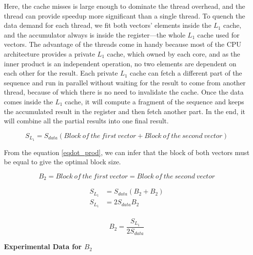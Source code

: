Here, the cache misses is large enough to dominate the thread overhead, 
and the thread can provide speedup more significant than a single thread. 
To quench the data demand for each thread, we fit both vectors' elements 
inside the $L_1$ cache, and the accumulator always is inside the register—the 
whole $L_1$ cache used for vectors. The advantage of the threads come in handy 
because most of the CPU architecture provides a private $L_1$ cache, which 
owned by each core, and as the inner product is an independent operation, 
no two elements are dependent on each other for the result. 
Each private $L_1$ cache can fetch a different part of the sequence 
and run in parallel without waiting for the result to come from another thread, 
because of which there is no need to invalidate the cache. Once the data comes 
inside the $L_1$ cache, it will compute a fragment of the sequence and keeps 
the accumulated result in the register and then fetch another part. 
In the end, it will combine all the partial results into one final result.

\[S_{L_1} = S_{data}(Block\ of\ the\ first\ vector + Block\ of\ the\ second\ vector)\]

From the equation \ref{eqdot_prod}, we can infer that the block of both vectors must
be equal to give the optimal block size.

\[B_2 = Block\ of\ the\ first\ vector = Block\ of\ the\ second\ vector\]

\begin{align*}
    S_{L_1} &= S_{data}(B_2 + B_2)\\
    S_{L_1} &= 2S_{data}B_2\\
\end{align*}

\begin{equation}
    B_2 = \frac{S_{L_1}}{2S_{data}}
    \label{eq:dot_block2}
\end{equation}

\newpage
\textbf{Experimental Data for $B_2$}

